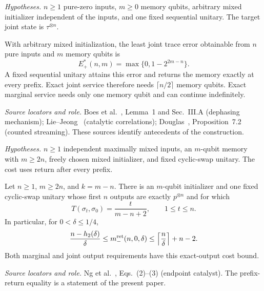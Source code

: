 \documentclass[11pt]{article}
\begin{document}
\par\medskip
\noindent\begin{minipage}{\linewidth}
\emph{Hypotheses.} $n\ge1$ pure-zero inputs, $m\ge0$ memory qubits, arbitrary mixed initializer independent of the inputs, and one fixed sequential unitary. The target joint state is $\tau^{\otimes n}$.

\begin{theorem}
With arbitrary mixed initialization, the least joint trace error obtainable from $n$ pure inputs and $m$ memory qubits is
\begin{equation}
 E_+^*(n,m)=\max\{0,1-2^{2m-n}\}.
\end{equation}
A fixed sequential unitary attains this error and returns the memory exactly at every prefix. Exact joint service therefore needs $\lceil n/2\rceil$ memory qubits. Exact marginal service needs only one memory qubit and can continue indefinitely.
\end{theorem}

\noindent\emph{Source locators and role.} Boes et al.~\cite{boes}, Lemma~1 and Sec.~III.A (dephasing mechanism); Lie--Jeong~\cite{lie} (catalytic correlations); Douglas~\cite{douglas}, Proposition~7.2 (counted streaming). These sources identify antecedents of the construction.
\end{minipage}
\par

\par\medskip
\noindent\begin{minipage}{\linewidth}
\emph{Hypotheses.} $n\ge1$ independent maximally mixed inputs, an $m$-qubit memory with $m\ge2n$, freely chosen mixed initializer, and fixed cyclic-swap unitary. The cost uses return after every prefix.

\begin{theorem}
Let $n\ge1$, $m\ge2n$, and $k=m-n$. There is an $m$-qubit initializer and one fixed cyclic-swap unitary whose first $n$ outputs are exactly $p^{\otimes n}$ and for which
\begin{equation}
 T(\sigma_t,\sigma_0)=\frac{t}{m-n+2},\qquad 1\le t\le n.
\end{equation}
In particular, for $0<\delta\le1/4$,
\begin{equation}
 \frac{n-h_2(\delta)}{\delta}
 \le m_-^{\rm ret}(n,0,\delta)
 \le \left\lceil\frac n\delta\right\rceil+n-2.
\end{equation}
Both marginal and joint output requirements have this exact-output cost bound.
\end{theorem}

\noindent\emph{Source locators and role.} Ng et al.~\cite{ng}, Eqs.~(2)--(3) (endpoint catalyst). The prefix-return equality is a statement of the present paper.
\end{minipage}
\par
\end{document}
